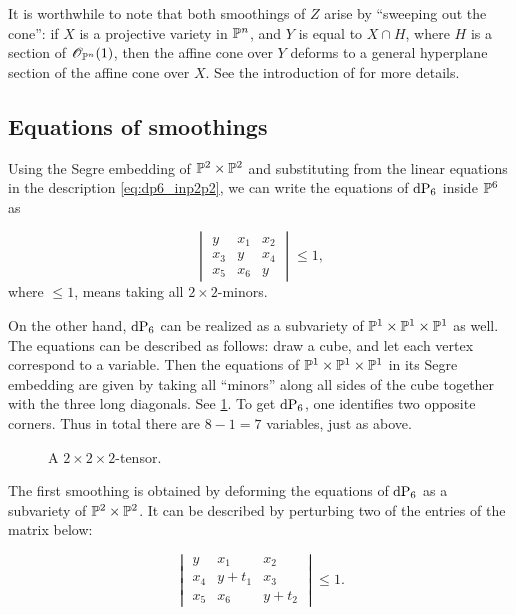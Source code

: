 It is worthwhile to note that both smoothings of $Z$ arise by ``sweeping out the cone'': if $X$ is a projective variety in $\P^n$, and $Y$ is equal to $X \cap H$, where $H$ is a section of $\OO_{\P^n}(1)$, then the affine cone over $Y$ deforms to a general hyperplane section of the affine cone over $X$. See the introduction of \cite{stevens_deformations} for more details.

\subsection{Equations of smoothings}

Using the Segre embedding of $\P^2 \times \P^2$ and substituting from the linear equations in the description \cref{eq:dp6_inp2p2}, we can write the equations of $\dP6$ inside $\P^6$ as

\begin{equation}
\begin{vmatrix}
y & x_1 & x_2 \\
x_3 & y & x_4 \\
x_5 & x_6 & y
\end{vmatrix} \leq 1,
\end{equation}
where $\leq 1$, means taking all $2 \times 2$-minors.

On the other hand, $\dP6$ can be realized as a subvariety of $\P^1 \times \P^1 \times \P^1$ as well. The equations can be described as follows: draw a cube, and let each vertex correspond to a variable. Then the equations of $\P^1 \times \P^1 \times \P^1$ in its Segre embedding are given by taking all ``minors'' along all sides of the cube together with the three long diagonals. See \cref{fig:p1p1p1_equations}. To get $\dP6$, one identifies two opposite corners. Thus in total there are $8-1=7$ variables, just as above. 

\begin{figure}[b]
\centering

\caption{A $2 \times 2 \times 2$-tensor.}
\label{fig:p1p1p1_equations}
\end{figure}

The first smoothing is obtained by deforming the equations of $\dP6$ as a subvariety of $\P^2 \times \P^2$.  It can be described by perturbing two of the entries of the matrix below:

\begin{equation}
\label{eq:def2}
\begin{vmatrix}
y & x_1 & x_2 \\
x_4 & y+t_1 & x_3 \\
x_5 & x_6 & y+t_2
\end{vmatrix} \leq 1.
\end{equation}


